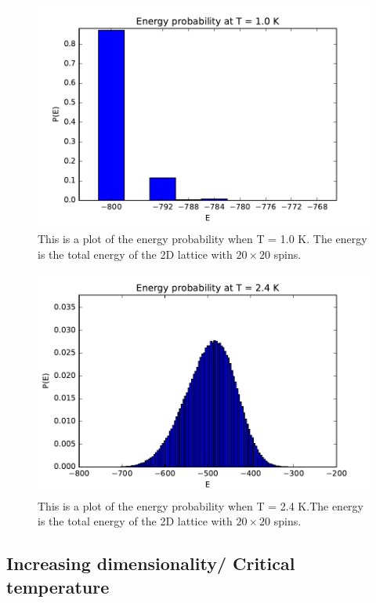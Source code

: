 \begin{figure}[H]
\includegraphics[width=\linewidth]{../results/4d/d_T_1probability}\caption{This is a plot of the energy probability when T = 1.0 K. The energy is the total energy of the 2D lattice with $20\times 20$ spins.}\label{fig:probability_T_1.0}
\end{figure}

\begin{figure}[H]
\includegraphics[width=\linewidth]{../results/4d/d_T_2_4probability}\caption{This is a plot of the energy probability when T = 2.4 K.The energy is the total energy of the 2D lattice with $20\times 20$ spins.}\label{fig:probability_T_2.4}
\end{figure}

\subsection{Increasing dimensionality/ Critical temperature}

